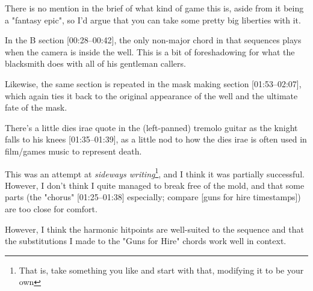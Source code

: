 

There is no mention in the brief of what kind of game this is, aside from it being a "fantasy epic", so I'd argue that you can take some pretty big liberties with it.

In the B section [00:28--00:42], the only non-major chord in that sequences plays when the camera is inside the well. This is a bit of foreshadowing for what the blacksmith does with all of his gentleman callers.

Likewise, the same section is repeated in the mask making section [01:53--02:07], which again ties it back to the original appearance of the well and the ultimate fate of the mask.

There's a little dies irae quote in the (left-panned) tremolo guitar as the knight falls to his knees [01:35--01:39], as a little nod to how the dies irae is often used in film/games music to represent death.

This was an attempt at \textit{sideways writing}\footnote{That is, take something you like and start with that, modifying it to be your own}, and I think it was partially successful. However, I don't think I quite managed to break free of the mold, and that some parts (the "chorus" [01:25--01:38] especially; compare [guns for hire timestamps]) are too close for comfort.

However, I think the harmonic hitpoints are well-suited to the sequence and that the substitutions I made to the "Guns for Hire" chords work well in context.
